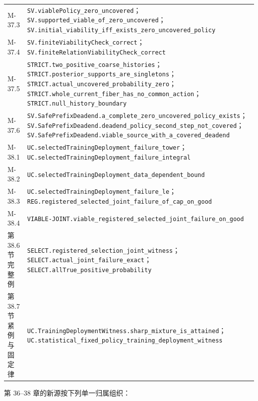 \documentclass[
  11pt,
  oneside]{book}
\begin{document}
{\begin{longtable}[]{@{}
  >{\raggedright\arraybackslash}p{}
  >{\raggedright\arraybackslash}p{}@{}}
M-37.3 & \nolinkurl{SV.viablePolicy_zero_uncovered}；\nolinkurl{SV.supported_viable_of_zero_uncovered}；\nolinkurl{SV.initial_viability_iff_exists_zero_uncovered_policy} \\
M-37.4 & \nolinkurl{SV.finiteViabilityCheck_correct}；\nolinkurl{SV.finiteRelationViabilityCheck_correct} \\
M-37.5 & \nolinkurl{STRICT.two_positive_coarse_histories}；\nolinkurl{STRICT.posterior_supports_are_singletons}；\nolinkurl{STRICT.actual_uncovered_probability_zero}；\nolinkurl{STRICT.whole_current_fiber_has_no_common_action}；\nolinkurl{STRICT.null_history_boundary} \\
M-37.6 & \nolinkurl{SV.SafePrefixDeadend.a_complete_zero_uncovered_policy_exists}；\nolinkurl{SV.SafePrefixDeadend.deadend_policy_second_step_not_covered}；\nolinkurl{SV.SafePrefixDeadend.viable_source_with_a_covered_deadend} \\
M-38.1 & \nolinkurl{UC.selectedTrainingDeployment_failure_tower}；\nolinkurl{UC.selectedTrainingDeployment_failure_integral} \\
M-38.2 & \nolinkurl{UC.selectedTrainingDeployment_data_dependent_bound} \\
M-38.3 & \nolinkurl{UC.selectedTrainingDeployment_failure_le}；\nolinkurl{REG.registered_selected_joint_failure_of_cap_on_good} \\
M-38.4 & \nolinkurl{VIABLE-JOINT.viable_registered_selected_joint_failure_on_good} \\
第 38.6 节完整例 & \nolinkurl{SELECT.registered_selection_joint_witness}；\nolinkurl{SELECT.actual_joint_failure_exact}；\nolinkurl{SELECT.allTrue_positive_probability} \\
第 38.7 节紧例与固定律 & \nolinkurl{UC.TrainingDeploymentWitness.sharp_mixture_is_attained}；\nolinkurl{UC.statistical_fixed_policy_training_deployment_witness} \\
\end{longtable}
}

第 36--38 章的新源按下列单一归属组织：
\end{document}
